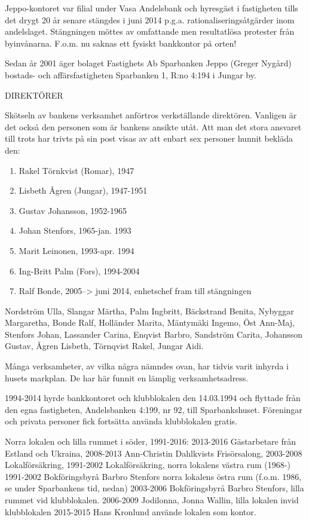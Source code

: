 Jeppo-kontoret var filial under Vasa Andelsbank och hyresgäst i fastigheten tills det drygt 20 år senare stängdes i juni 2014 p.g.a. rationaliseringsåtgärder inom andelslaget. Stängningen möttes av omfattande men resultatlösa protester från byinvånarna. F.o.m. nu saknas ett fysiskt bankkontor på orten!

Sedan år 2001 äger bolaget Fastighets Ab Sparbanken Jeppo (Greger Nygård) bostads- och affärsfastigheten Sparbanken 1, R:no 4:194 i Jungar by.


DIREKTÖRER

Skötseln av bankens verksamhet anförtros verkställande direktören. Vanligen är det också den personen som är bankens ansikte utåt. Att man det stora ansvaret till trots har trivts på sin post visas av att enbart sex personer hunnit bekläda den:
\begin{enumerate}
  \item Rakel Törnkvist (Romar),  1947
  \item Lisbeth Ågren (Jungar),   1947-1951
  \item Gustav Johansson,         1952-1965
  \item Johan Stenfors,           1965-jan. 1993
  \item Marit Leinonen,           1993-apr. 1994
  \item Ing-Britt Palm (Fors),    1994-2004
  \item Ralf Bonde,               2005--> juni 2014, enhetschef fram till stängningen
\end{enumerate}


Nordström Ulla, Slangar Märtha, Palm Ingbritt, Bäckstrand Benita, Nybyggar Margaretha, Bonde Ralf, Holländer Marita, Mäntymäki Ingemo, Öst Ann-Maj, Stenfors Johan, Lassander Carina, Enqvist Barbro, Sandström Carita, Johansson Gustav, Ågren Lisbeth, Törnqvist Rakel, Jungar Aidi.



Många verksamheter, av vilka några nämndes ovan, har tidvis varit inhyrda i husets markplan. De har här funnit en lämplig verksamhetsadress.

1994-2014
 hyrde bankkontoret och klubblokalen den 14.03.1994 och flyttade från den egna fastigheten, Andelsbanken 4:199, nr 92, till Sparbankshuset. Föreningar och privata personer fick fortsätta använda klubblokalen gratis.

Norra lokalen och lilla rummet i söder, 1991-2016:
2013-2016   Gästarbetare från Estland och Ukraina,
2008-2013   Ann-Christin Dahlkvists Frisörsalong,
2003-2008   Lokalförsäkring,
1991-2002   Lokalförsäkring, norra lokalens västra rum (1968-)
1991-2002   Bokföringsbyrå Barbro Stenfors norra lokalens	östra rum (f.o.m. 1986, se under Sparbankens tid, nedan)
2003-2006   Bokföringsbyrå Barbro Stenfors, lilla rummet vid klubblokalen.
2006-2009   Jodilonna, Jonna Wallin, lilla lokalen invid klubblokalen
2015-2015   Hans Kronlund använde lokalen som kontor.

